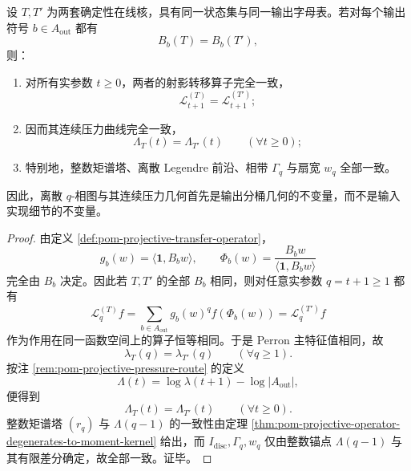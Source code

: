\begin{theorem}[输出分桶几何的扇保持性]\label{thm:conclusion-output-bucket-geometry-preserves-discrete-fan}
设 \(T,T'\) 为两套确定性在线核，具有同一状态集与同一输出字母表。若对每个输出符号 \(b\in A_{\mathrm{out}}\) 都有
\[
B_b(T)=B_b(T'),
\]
则：
\begin{enumerate}
  \item 对所有实参数 \(t\ge 0\)，两者的射影转移算子完全一致，
  \[
  \mathcal L_{t+1}^{(T)}=\mathcal L_{t+1}^{(T')};
  \]
  \item 因而其连续压力曲线完全一致，
  \[
  \Lambda_T(t)=\Lambda_{T'}(t)
  \qquad(\forall t\ge 0);
  \]
  \item 特别地，整数矩谱塔、离散 Legendre 前沿、相带 \(\Gamma_q\) 与扇宽 \(w_q\) 全部一致。
\end{enumerate}
因此，离散 \(q\)-相图与其连续压力几何首先是输出分桶几何的不变量，而不是输入实现细节的不变量。
\end{theorem}
\begin{proof}
由定义 \ref{def:pom-projective-transfer-operator}，
\[
g_b(w)=\langle\mathbf 1,B_bw\rangle,
\qquad
\Phi_b(w)=\frac{B_bw}{\langle\mathbf 1,B_bw\rangle}
\]
完全由 \(B_b\) 决定。因此若 \(T,T'\) 的全部 \(B_b\) 相同，则对任意实参数 \(q=t+1\ge 1\) 都有
\[
\mathcal L_q^{(T)}f
=
\sum_{b\in A_{\mathrm{out}}}g_b(w)^q f(\Phi_b(w))
=
\mathcal L_q^{(T')}f
\]
作为作用在同一函数空间上的算子恒等相同。于是 Perron 主特征值相同，故
\[
\lambda_T(q)=\lambda_{T'}(q)
\qquad (\forall q\ge 1).
\]
按注 \ref{rem:pom-projective-pressure-route} 的定义
\[
\Lambda(t)=\log\lambda(t+1)-\log|A_{\mathrm{out}}|,
\]
便得到
\[
\Lambda_T(t)=\Lambda_{T'}(t)
\qquad (\forall t\ge 0).
\]
整数矩谱塔 \((r_q)\) 与 \(\Lambda(q-1)\) 的一致性由定理 \ref{thm:pom-projective-operator-degenerates-to-moment-kernel} 给出，而 \(I_{\mathrm{disc}},\Gamma_q,w_q\) 仅由整数锚点 \(\Lambda(q-1)\) 与其有限差分确定，故全部一致。证毕。
\end{proof}


